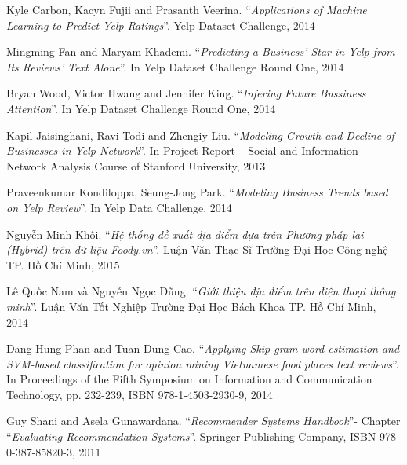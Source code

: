 \documentclass[12pt]{extarticle}
\begin{document}
\par [12]	\hspace{4pt}Kyle Carbon, Kacyn Fujii and Prasanth Veerina. “\textit{Applications of Machine Learning to Predict Yelp Ratings}”. Yelp Dataset Challenge, 2014
\par [13]	\hspace{4pt}Mingming Fan and Maryam Khademi. “\textit{Predicting a Business’ Star in Yelp from Its Reviews’ Text Alone}”. In Yelp Dataset Challenge Round One, 2014
\par [14]	\hspace{4pt}Bryan Wood, Victor Hwang and Jennifer King. “\textit{Infering Future Bussiness Attention}”. In Yelp Dataset Challenge Round One, 2014
\par [15]	\hspace{4pt}Kapil Jaisinghani, Ravi Todi and Zhengiy Liu. “\textit{Modeling Growth and Decline of Businesses in Yelp Network}”. In Project Report – Social and Information Network Analysis Course of Stanford University, 2013
\par [16]	\hspace{4pt}Praveenkumar Kondiloppa, Seung-Jong Park. “\textit{Modeling Business Trends based on Yelp Review}”. In Yelp Data Challenge, 2014 
\par [17]	\hspace{4pt}Nguyễn Minh Khôi. “\textit{Hệ thống đề xuất địa điểm dựa trên Phương pháp lai (Hybrid) trên dữ liệu Foody.vn}”. Luận Văn Thạc Sĩ Trường Đại Học Công nghệ TP. Hồ Chí Minh, 2015
\par [18]	\hspace{4pt}Lê Quốc Nam và Nguyễn Ngọc Dũng. “\textit{Giới thiệu địa điểm trên điện thoại thông minh}”. Luận Văn Tốt Nghiệp Trường Đại Học Bách Khoa TP. Hồ Chí Minh, 2014
\par [19]	\hspace{4pt}Dang Hung Phan and Tuan Dung Cao. “\textit{Applying Skip-gram word estimation and SVM-based classification for opinion mining Vietnamese food places text reviews}”. In Proceedings of the Fifth Symposium on Information and Communication Technology, pp. 232-239, ISBN 978-1-4503-2930-9, 2014
\par [20]	\hspace{4pt}Guy Shani and Asela Gunawardana. “\textit{Recommender Systems Handbook}”- Chapter “\textit{Evaluating Recommendation Systems}”. Springer Publishing Company, ISBN 978-0-387-85820-3, 2011


%		 
%		
\end{document}
